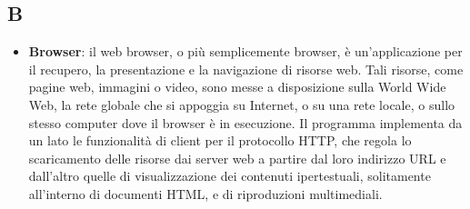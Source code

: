 \subsection{B}
\begin{itemize} 
	\item
	\textbf{Browser}: il web browser, o più semplicemente browser, è un'applicazione per il recupero, la presentazione e la navigazione di risorse web. Tali risorse, come pagine web, immagini o video, sono messe a disposizione sulla World Wide Web, la rete globale che si appoggia su Internet, o su una rete locale, o sullo stesso computer dove il browser è in esecuzione. Il programma implementa da un lato le funzionalità di client per il protocollo HTTP, che regola lo scaricamento delle risorse dai server web a partire dal loro indirizzo URL e dall'altro quelle di visualizzazione dei contenuti ipertestuali, solitamente all'interno di documenti HTML, e di riproduzioni multimediali.

\end{itemize}